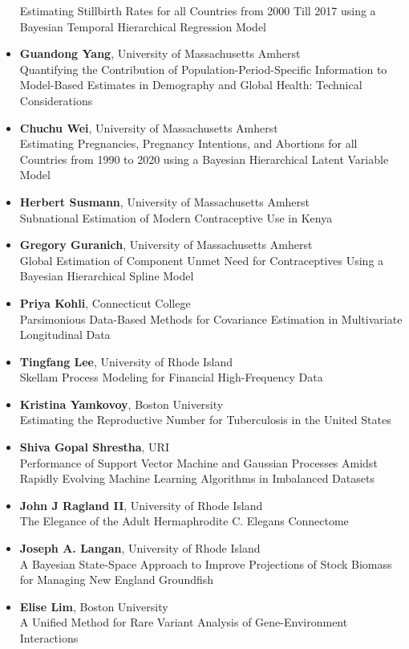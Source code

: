 \begin{itemize}
Estimating Stillbirth Rates for all Countries from 2000 Till 2017 using a Bayesian Temporal Hierarchical Regression Model
\item \textbf{Guandong Yang}, University of Massachusetts Amherst \\
Quantifying the Contribution of Population-Period-Specific Information to Model-Based Estimates in Demography and Global Health: Technical Considerations
\item \textbf{Chuchu Wei}, University of Massachusetts Amherst \\
Estimating Pregnancies, Pregnancy Intentions, and Abortions for all Countries from 1990 to 2020 using a Bayesian Hierarchical Latent Variable Model
\item \textbf{Herbert Susmann}, University of Massachusetts Amherst \\
Subnational Estimation of Modern Contraceptive Use in Kenya
\item \textbf{Gregory Guranich}, University of Massachusetts Amherst \\
Global Estimation of Component Unmet Need for Contraceptives Using a Bayesian Hierarchical Spline Model
\item \textbf{Priya Kohli}, Connecticut College \\
Parsimonious Data-Based Methods for Covariance Estimation in Multivariate Longitudinal Data
\item \textbf{Tingfang Lee}, University of Rhode Island \\
Skellam Process Modeling for Financial High-Frequency Data
\item \textbf{Kristina Yamkovoy}, Boston University \\
Estimating the Reproductive Number for Tuberculosis in the United States
\item \textbf{Shiva Gopal Shrestha}, URI \\
Performance of Support Vector Machine  and Gaussian Processes Amidst Rapidly Evolving  Machine Learning Algorithms in Imbalanced Datasets
\item \textbf{John J Ragland II}, University of Rhode Island \\
The Elegance of the Adult Hermaphrodite C. Elegans Connectome
\item \textbf{Joseph A. Langan}, University of Rhode Island \\
A Bayesian State-Space Approach to Improve Projections of Stock Biomass for Managing New England Groundfish
\item \textbf{Elise Lim}, Boston University \\
A Unified Method for Rare Variant Analysis of Gene-Environment Interactions
\end{itemize}

